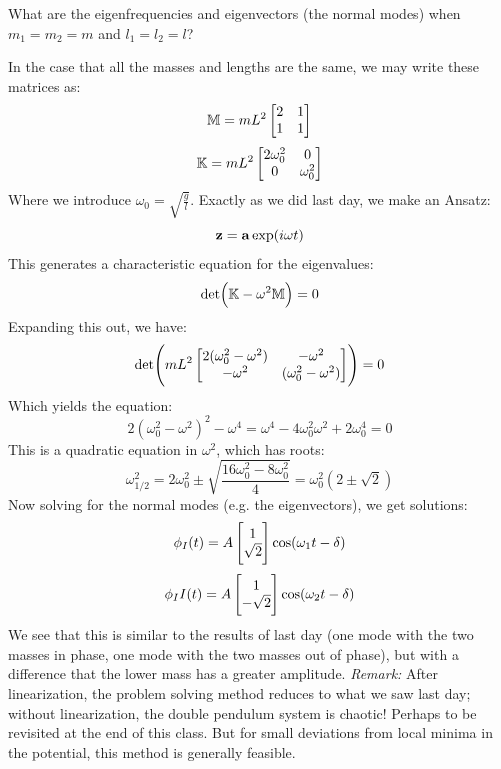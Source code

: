 \documentclass[../PHYS306Notes.tex]{subfiles}
\begin{document}
\begin{p}
What are the eigenfrequencies and eigenvectors (the normal modes) when $m_1 = m_2 = m$ and $l_1 = l_2 = l$?
\end{p}
\begin{s}
In the case that all the masses and lengths are the same, we may write these matrices as:
\[\mathbb{M} = mL^2\begin{bmatrix}2 & 1 \\ 1 & 1\end{bmatrix}\]
\[\mathbb{K} = mL^2\begin{bmatrix}2\omega_0^2 & 0 \\ 0 & \omega_0^2\end{bmatrix}\]
Where we introduce $\omega_0 = \sqrt{\frac{g}{l}}$. Exactly as we did last day, we make an Ansatz:
\[\mathbf{z} = \mathbf{a}\exp(i\omega t)\]
This generates a characteristic equation for the eigenvalues:
\[\det(\mathbb{K} - \omega^2\mathbb{M}) = 0\]
Expanding this out, we have:
\[\det(mL^2\begin{bmatrix}2(\omega_0^2 -\omega^2) & -\omega^2 \\ -\omega^2 & (\omega_0^2 - \omega^2)\end{bmatrix}) = 0\]
Which yields the equation:
\[2(\omega_0^2 - \omega^2)^2 - \omega^4 = \omega^4 - 4\omega_0^2\omega^2 + 2\omega_0^4 = 0\]
This is a quadratic equation in $\omega^2$, which has roots:
\[\omega_{1/2}^2 = 2\omega_0^2 \pm\sqrt{\frac{16\omega_0^2 - 8\omega_0^2}{4}} = \omega_0^2\left(2\pm \sqrt{2}\right)\]
Now solving for the normal modes (e.g. the eigenvectors), we get solutions:
\[\phi_I(t) = A\begin{bmatrix}1 \\ \sqrt{2}\end{bmatrix}\cos(\omega_1 t - \delta)\]
\[\phi_II(t) = A\begin{bmatrix}1 \\ -\sqrt{2}\end{bmatrix}\cos(\omega_2 t - \delta)\]
We see that this is similar to the results of last day (one mode with the two masses in phase, one mode with the two masses out of phase), but with a difference that the lower mass has a greater amplitude.
\newline\textit{Remark:} After linearization, the problem solving method reduces to what we saw last day; without linearization, the double pendulum system is chaotic! Perhaps to be revisited at the end of this class. But for small deviations from local minima in the potential, this method is generally feasible.
\end{s}
\end{document}
